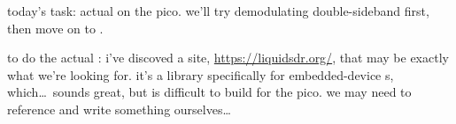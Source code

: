 today's task: actual \dsp on the pico. we'll try demodulating double-sideband
\am first, then move on to \ssb.

to do the actual \dsp: i've discoved a site,
\href{https://liquidsdr.org/}{https://liquidsdr.org/}, that may be exactly what
we're looking for. it's a \dsp library specifically for embedded-device
{\sdr}s, which\dots\ sounds great, but is difficult to build for the pico. we
may need to reference \autocite{discrete-hilbert} and write something
ourselves\dots
